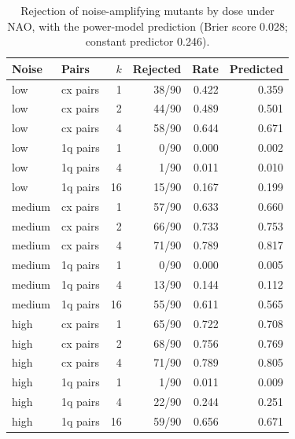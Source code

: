 \begin{table}[t]
\centering
\caption{Rejection of noise-amplifying mutants by dose under NAO, with the power-model prediction (Brier score 0.028; constant predictor 0.246).}
\label{tab:rq2-dose}
\small
\begin{tabular}{llrrrr}
\toprule
Noise & Pairs & $k$ & Rejected & Rate & Predicted \\
\midrule
low & cx pairs & 1 & 38/90 & 0.422 & 0.359 \\
low & cx pairs & 2 & 44/90 & 0.489 & 0.501 \\
low & cx pairs & 4 & 58/90 & 0.644 & 0.671 \\
low & 1q pairs & 1 & 0/90 & 0.000 & 0.002 \\
low & 1q pairs & 4 & 1/90 & 0.011 & 0.010 \\
low & 1q pairs & 16 & 15/90 & 0.167 & 0.199 \\
medium & cx pairs & 1 & 57/90 & 0.633 & 0.660 \\
medium & cx pairs & 2 & 66/90 & 0.733 & 0.753 \\
medium & cx pairs & 4 & 71/90 & 0.789 & 0.817 \\
medium & 1q pairs & 1 & 0/90 & 0.000 & 0.005 \\
medium & 1q pairs & 4 & 13/90 & 0.144 & 0.112 \\
medium & 1q pairs & 16 & 55/90 & 0.611 & 0.565 \\
high & cx pairs & 1 & 65/90 & 0.722 & 0.708 \\
high & cx pairs & 2 & 68/90 & 0.756 & 0.769 \\
high & cx pairs & 4 & 71/90 & 0.789 & 0.805 \\
high & 1q pairs & 1 & 1/90 & 0.011 & 0.009 \\
high & 1q pairs & 4 & 22/90 & 0.244 & 0.251 \\
high & 1q pairs & 16 & 59/90 & 0.656 & 0.671 \\
\bottomrule
\end{tabular}
\end{table}
